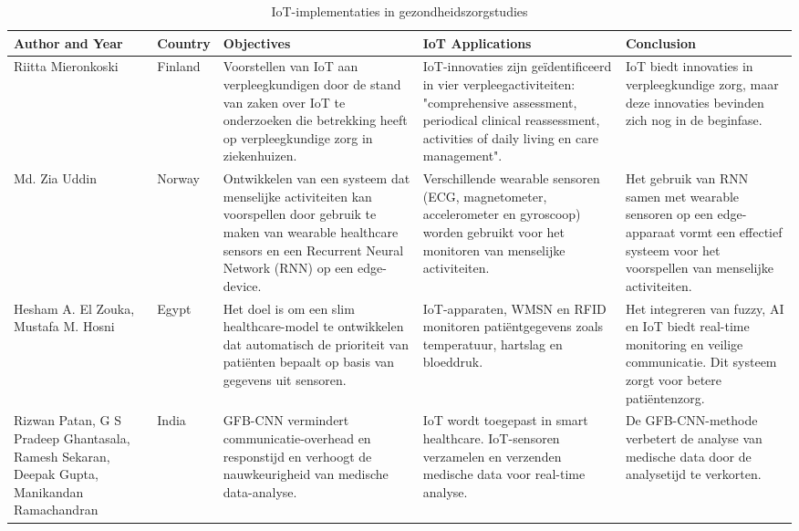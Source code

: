 \begin{table}[h]
    \centering
    \tiny
    \caption{IoT-implementaties in gezondheidszorgstudies \autocite{Mieronkoski2017, Uddin2019, ElZouka2021, Patan2020}}
    \begin{tabularx}{\textwidth}{|p{2cm}|p{1.5cm}|p{3.5cm}|p{3.5cm}|X|}
        \hline
        \textbf{Author and Year} & \textbf{Country} & \textbf{Objectives} & \textbf{IoT Applications} & \textbf{Conclusion} \\
        \hline
        Riitta Mieronkoski  
        & Finland  
        & Voorstellen van IoT aan verpleegkundigen door de stand van zaken over IoT te onderzoeken die betrekking heeft op verpleegkundige zorg in ziekenhuizen.          
        & IoT-innovaties zijn geïdentificeerd in vier verpleegactiviteiten: "comprehensive assessment, periodical clinical reassessment, activities of daily living en care management".  
        & IoT biedt innovaties in verpleegkundige zorg, maar deze innovaties bevinden zich nog in de beginfase. \\  
        \hline
        Md. Zia Uddin  
        & Norway  
        & Ontwikkelen van een systeem dat menselijke activiteiten kan voorspellen door gebruik te maken van wearable healthcare sensors en een Recurrent Neural Network (RNN) op een edge-device.  
        & Verschillende wearable sensoren (ECG, magnetometer, accelerometer en gyroscoop) worden gebruikt voor het monitoren van menselijke activiteiten.  
        & Het gebruik van RNN samen met wearable sensoren op een edge-apparaat vormt een effectief systeem voor het voorspellen van menselijke activiteiten. \\  
        \hline
        Hesham A. El Zouka, Mustafa M. Hosni  
        & Egypt  
        & Het doel is om een slim healthcare-model te ontwikkelen dat automatisch de prioriteit van patiënten bepaalt op basis van gegevens uit sensoren.  
        & IoT-apparaten, WMSN en RFID monitoren patiëntgegevens zoals temperatuur, hartslag en bloeddruk.  
        & Het integreren van fuzzy, AI en IoT biedt real-time monitoring en veilige communicatie. Dit systeem zorgt voor betere patiëntenzorg. \\  
        \hline
        Rizwan Patan, G S Pradeep Ghantasala, Ramesh Sekaran, Deepak Gupta, Manikandan Ramachandran  
        & India  
        & GFB-CNN vermindert communicatie-overhead en responstijd en verhoogt de nauwkeurigheid van medische data-analyse.  
        & IoT wordt toegepast in smart healthcare. IoT-sensoren verzamelen en verzenden medische data voor real-time analyse.  
        & De GFB-CNN-methode verbetert de analyse van medische data door de analysetijd te verkorten. \\  
        \hline
    \end{tabularx}
    \label{tab:IoT_healthcare}
\end{table}


